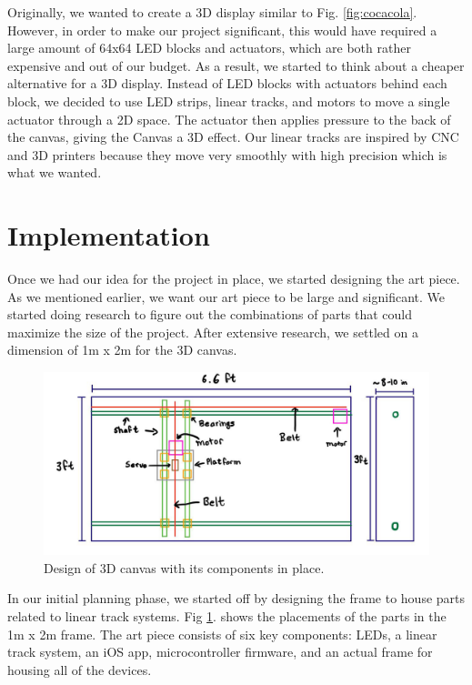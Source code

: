 \documentclass[11pt]{IEEEtran}
\begin{document}
Originally, we wanted to create a 3D display similar to Fig. \ref{fig:cocacola}. However, in order to make our project significant, this would have required a large amount of 64x64 LED blocks and actuators, which are both rather expensive and out of our budget. As a result, we started to think about a cheaper alternative for a 3D display. Instead of LED blocks with actuators behind each block, we decided to use LED strips, linear tracks, and motors to move a single actuator through a 2D space. The actuator then applies pressure to the back of the canvas, giving the Canvas a 3D effect. Our linear tracks are inspired by CNC and 3D printers because they move very smoothly with high precision which is what we wanted.

\section{Implementation}
Once we had our idea for the project in place, we started designing the art piece. As we mentioned earlier, we want our art piece to be large and significant. We started doing research to figure out the combinations of parts that could maximize the size of the project. After extensive research, we settled on a dimension of 1m x 2m for the 3D canvas.

\begin{figure}[H]
  \centering
  \includegraphics[width=\columnwidth]{image4.png}
  \caption{Design of 3D canvas with its components in place.}
  \label{fig:design}
\end{figure}

In our initial planning phase, we started off by designing the frame to house parts related to linear track systems. Fig \ref{fig:design}. shows the placements of the parts in the 1m x 2m frame. The art piece consists of six key components: LEDs, a linear track system, an iOS app, microcontroller firmware, and an actual frame for housing all of the devices.
\end{document}
